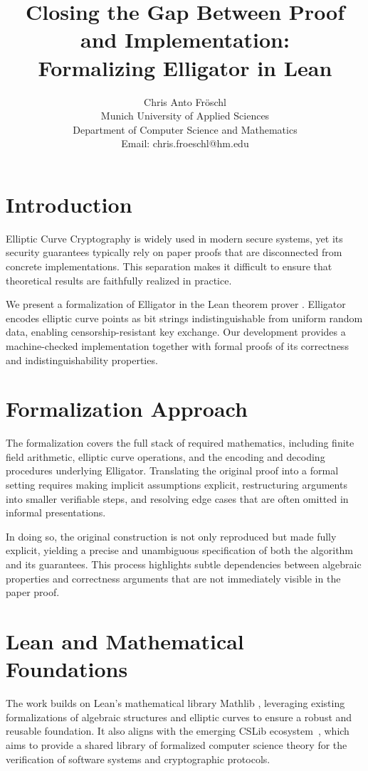\documentclass[11pt,a4paper]{article}
\title{\textbf{Closing the Gap Between Proof and Implementation:\\
Formalizing Elligator in Lean}}
\author{
Chris Anto Fröschl\orcidlink{0009-0006-3562-5395}\\
Munich University of Applied Sciences\\
Department of Computer Science and Mathematics\\
Email: chris.froeschl@hm.edu
}
\date{}
\begin{document}
\maketitle

\section{Introduction}

Elliptic Curve Cryptography is widely used in modern secure systems, yet its security
guarantees typically rely on paper proofs that are disconnected from concrete implementations.
This separation makes it difficult to ensure that theoretical results are faithfully realized
in practice.

We present a formalization of Elligator \cite{Bernstein2013a}
in the Lean theorem prover \cite{demoura2021a}. Elligator encodes elliptic curve points as bit strings
indistinguishable from uniform random data, enabling censorship-resistant key exchange.
Our development provides a machine-checked implementation together with formal proofs
of its correctness and indistinguishability properties.

\section{Formalization Approach}

The formalization covers the full stack of required mathematics, including finite field
arithmetic, elliptic curve operations, and the encoding and decoding procedures underlying
Elligator. Translating the original proof into a formal setting requires making implicit
assumptions explicit, restructuring arguments into smaller verifiable steps, and resolving
edge cases that are often omitted in informal presentations.

In doing so, the original construction is not only reproduced but made fully explicit,
yielding a precise and unambiguous specification of both the algorithm and its guarantees.
This process highlights subtle dependencies between algebraic properties and correctness
arguments that are not immediately visible in the paper proof.

\section{Lean and Mathematical Foundations}

The work builds on Lean’s mathematical library Mathlib \cite{mathlib2019a}, leveraging existing formalizations
of algebraic structures and elliptic curves to ensure a robust and reusable foundation.
It also aligns with the emerging CSLib ecosystem~\cite{demoura2026a}, which aims to provide
a shared library of formalized computer science theory for the verification of software
systems and cryptographic protocols.
\end{document}
